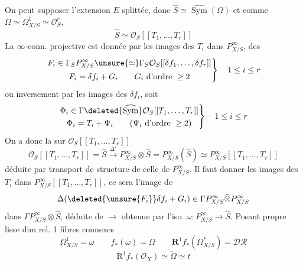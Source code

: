 On peut supposer l'extension $E$ splittée, donc $\widehat S\simeq\widehat{\operatorname{Sym}}(\Omega)$ et comme $\Omega\simeq\Omega^1_{X/S}\simeq\mathcal{O}_S^r$,
\[
\widehat S\simeq\mathcal{O}_S[[T_1,\ldots,T_r]]
\]
La $\infty$-conn. projective est
donnée par les images des $T_i$ dans $P^\infty_{X/S}$, des
\[
\left.\begin{gathered}
F_i\in\Gamma_S P^\infty_{X/S}\unsure{\simeq}\Gamma_S\mathcal{O}_S[[\delta f_1,\ldots,\delta f_r]]\\
F_i=\delta f_i+G_i\qquad G_i\text{ d'ordre }\geq2
\end{gathered}\right\}\quad1\leq i\leq r
\]
ou inversement par les images des $\delta f_i$, soit
\[
\left.\begin{gathered}
\Phi_i\in\Gamma\deleted{\widehat{\operatorname{Sym}}}\mathcal{O}_S[[T_1,\ldots,T_r]]\\
\Phi_i=T_i+\Psi_i\qquad(\Psi_i\text{ d'ordre }\geq2)
\end{gathered}\right\}\quad1\leq i\leq r
\]
On a donc la   sur $\mathcal{O}_S[[T_1,\ldots,T_r]]$
\[
\mathcal{O}_S[[T_1,\ldots,T_r]]=\widehat S\xrightarrow{\Delta'}P^\infty_{X/S}\otimes\widehat S=P^\infty_{X/S}(\widehat S)\simeq P^\infty_{X/S}[[T_1,\ldots,T_r]]
\]
déduite par transport de structure de celle de $P^\infty_{X/S}$. Il faut donner les images des $T_i$ dans $P^\infty_{X/S}[[T_1,\ldots,T_r]]$, ce sera l'image de
\[
\Delta(\deleted{\unsure{F_i}}\delta f_i+G_i)\in\Gamma P^\infty_{X/S}\widehat\otimes P^\infty_{X/S}
\]
dans $\Gamma P^\infty_{X/S}\otimes\widehat S$, déduite de $\longrightarrow$ obtenue par l'iso. $\omega:P^\infty_{X/S}\to\widehat S$. Posant
propre lisse dim rel. 1 fibres connexes
\[
\Omega^1_{X/S}=\omega\qquad f_*(\omega)=\Omega\qquad
\mathbf{R}^1f_*(\Omega^*_{X/S})=\mathcal{DR}
\]
\[
\mathrm{R}^1f_*(\mathcal{O}_X)\simeq\check\Omega\simeq t
\]
